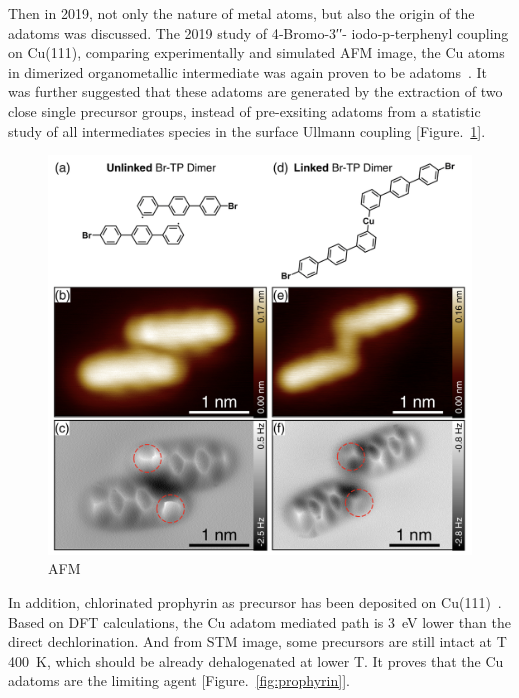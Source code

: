 \documentclass[aps,reprint,amsmath,amssymb]{revtex4-2}
\begin{document}
Then in 2019, not only the nature of metal atoms, but also the origin of the adatoms was discussed. The 2019 study of 4‐Bromo-3′′- iodo‐p‐terphenyl coupling on Cu(111), comparing experimentally and simulated AFM image, the Cu atoms in dimerized organometallic intermediate was again proven to be adatoms~\cite{acsnano2019}. It was further suggested that these adatoms are generated by the extraction of two close single precursor groups, instead of pre-exsiting adatoms from a statistic study of all intermediates species in the surface Ullmann coupling [Figure.~\ref{fig:6}].
%
\begin{figure}[ht]
\centering
\includegraphics[width=0.98\columnwidth]{Fig/AFM_prove.png}
\caption{AFM}
\label{fig:6}
\end{figure}

In addition, chlorinated prophyrin as precursor has been deposited on Cu(111)~\cite{chematerial2019}. Based on DFT calculations, the Cu adatom mediated path is 3~eV lower than the direct dechlorination. And from STM image, some precursors are still intact at T 400~K, which should be already dehalogenated at lower T. It proves that the Cu adatoms are the limiting agent [Figure.~\ref{fig:prophyrin}].
\end{document}
